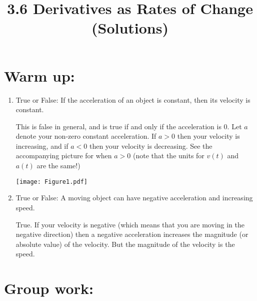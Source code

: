 \documentclass[nooutcomes]{ximera}
\title{3.6 Derivatives as Rates of Change (Solutions)}
\begin{document}
\begin{abstract}		\end{abstract}
\maketitle

\section*{Warm up:} 

	\begin{enumerate}
	
	\item  True or False:  If the acceleration of an object is constant, then its velocity is constant.

		\begin{freeResponse}
		This is false in general, and is true if and only if the acceleration is 0.  Let $a$ denote your non-zero constant acceleration.  If $a > 0$ then your velocity is increasing, and if $a < 0$ then your velocity is decreasing.  See the accompanying picture for when $a>0$ (note that the units for $v(t)$ and $a(t)$ are  the same!)
		
			\begin{image}
			\texttt{[image: Figure1.pdf]}
			\end{image}
		\end{freeResponse}	
		
		
	
	\item  True or False:  A moving object can have negative acceleration and increasing speed.

		\begin{freeResponse}
		True.  If your velocity is negative (which means that you are moving in the negative direction) then a negative acceleration increases the magnitude (or absolute value) of the velocity.  But the magnitude of the velocity is the speed.
		\end{freeResponse}	
		
		
		
	\end{enumerate}
	
	
	
	
	

\section*{Group work:}
\end{document}
